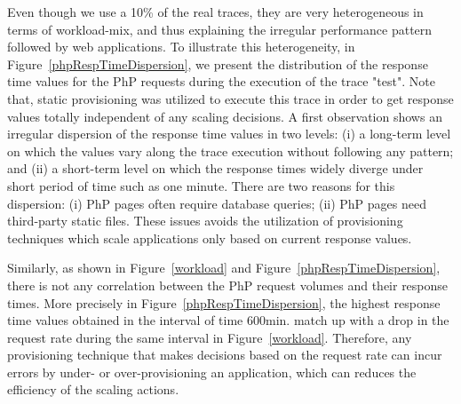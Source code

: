 Even though we use a 10\% of the real traces, they are very heterogeneous in terms of workload-mix, and thus explaining the irregular performance pattern followed by web applications. To illustrate this heterogeneity, in Figure~\ref{phpRespTimeDispersion}, we present the distribution of the response time values for the PhP requests during the execution of the trace "test". Note that, static provisioning was utilized to execute this trace in order to get response values totally independent of any scaling decisions. A first observation shows an irregular dispersion of the response time values in two levels: (i) a long-term level on which the values vary along the trace execution without following any pattern; and (ii) a short-term level on which the response times widely diverge under short period of time such as one minute. There are two reasons for this dispersion: (i) PhP pages often require database queries; (ii) PhP pages need third-party static files. These issues avoids the utilization of provisioning techniques which scale applications only based on current response values. 

Similarly, as shown in Figure~\ref{workload} and Figure~\ref{phpRespTimeDispersion}, there is not any correlation between the PhP request volumes and their response times. More precisely in Figure~\ref{phpRespTimeDispersion}, the highest response time values obtained in the interval of time 600min. match up with a drop in the request rate during the same interval in Figure~\ref{workload}. Therefore, any provisioning technique that makes decisions based on the request rate can incur errors by under- or over-provisioning an application, which can reduces the efficiency of the scaling actions. 





